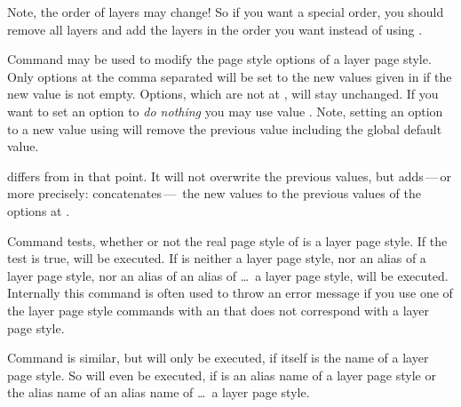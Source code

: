 Note, the order of layers may change! So if
you want a special order, you should remove all layers and add the layers in
the order you want instead of using .%
\EndIndexGroup


\begin{Declaration}
\end{Declaration}
Command  may be used to modify the page
style options of a layer page style. Only options at the comma separated
 will be set to the new values given in 
if the new value is not empty. Options, which are not at ,
will stay unchanged. If you want to set an option to \emph{do nothing} you may
use value . Note, setting an option to a new value using
 will remove the previous value including
the global default value.

 differs from
 in that point. It will not overwrite the
previous values, but adds\,---\,or more precisely: concatenates\,---\, the new
values to the previous values of the options at .%
\EndIndexGroup


\begin{Declaration}
\end{Declaration}
Command  tests, whether or not the real page
style of  is a layer page style. If the test is true,
 will be executed. If  is neither a
layer page style, nor an alias of a layer page style, nor an alias of an alias
of \dots\ a layer page style,  will be executed. Internally
this command is often used to throw an error message if you use one of the
layer page style commands with an  that does not
correspond with a layer page style.

Command  is similar, but 
will only be executed, if  itself is the name of a
layer page style. So  will even be executed, if  is an alias name of a layer page style or the alias name of an
alias name of \dots\ a layer page style.%
\EndIndexGroup


